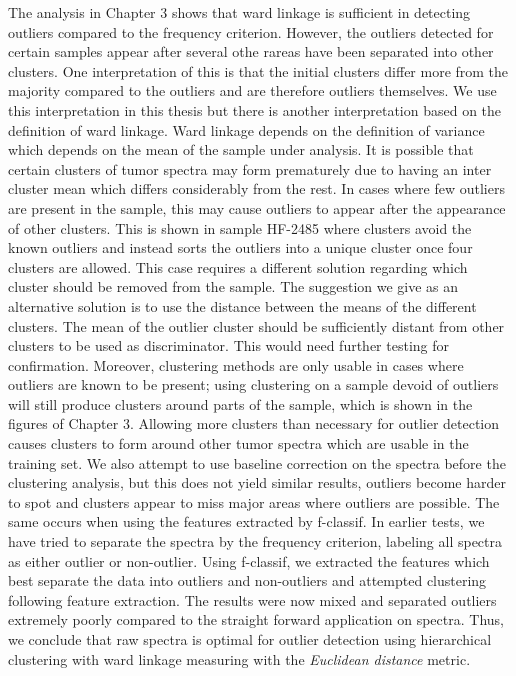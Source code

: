 The analysis in Chapter 3 shows that ward linkage is sufficient in detecting outliers compared to the frequency criterion. However, the outliers detected for certain samples appear after several othe rareas have been separated into other clusters. One interpretation of this is that the initial clusters differ more from the majority compared to the outliers and are therefore outliers themselves. We use this interpretation in this thesis but there is another interpretation based on the definition of ward linkage. Ward linkage depends on the definition of variance which depends on the mean of the sample under analysis. It is possible that certain clusters of tumor spectra may form prematurely due to having an inter cluster mean which differs considerably from the rest. In cases where few outliers are present in the sample, this may cause outliers to appear after the appearance of other clusters. This is shown in sample HF-2485 where clusters avoid the known outliers and instead sorts the outliers into a unique cluster once four clusters are allowed. This case requires a different solution regarding which cluster should be removed from the sample. The suggestion we give as an alternative solution is to use the distance between the means of the different clusters. The mean of the outlier cluster should be sufficiently distant from other clusters to be used as discriminator. This would need further testing for confirmation. Moreover, clustering methods are only usable in cases where outliers are known to be present; using clustering on a sample devoid of outliers will still produce clusters around parts of the sample, which is shown in the figures of Chapter 3. Allowing more clusters than necessary for outlier detection causes clusters to form around other tumor spectra which are usable in the training set. We also attempt to use baseline correction on the spectra before the clustering analysis, but this does not yield similar results, outliers become harder to spot and clusters appear to miss major areas where outliers are possible. The same occurs when using the features extracted by f-classif. In earlier tests, we have tried to separate the spectra by the frequency criterion, labeling all spectra as either outlier or non-outlier. Using f-classif, we extracted the features which best separate the data into outliers and non-outliers and attempted clustering following feature extraction. The results were now mixed and separated outliers extremely poorly compared to the straight forward application on spectra. Thus, we conclude that raw spectra is optimal for outlier detection using hierarchical clustering with ward linkage measuring with the \textit{Euclidean distance} metric.

